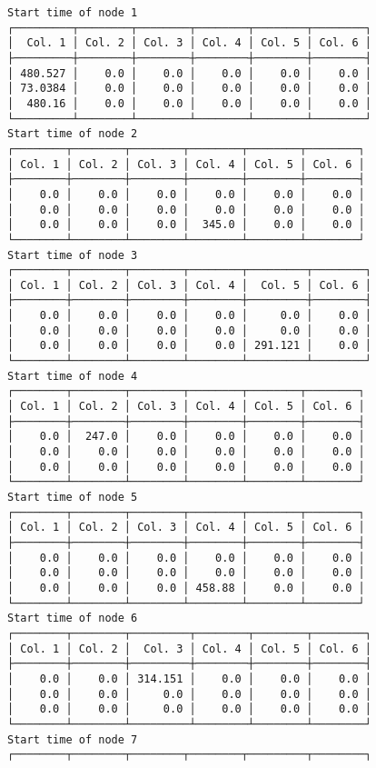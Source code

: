 \documentclass[12pt,a4paper]{article}
\begin{document}
\begin{lstlisting}
Start time of node 1
┌─────────┬────────┬────────┬────────┬────────┬────────┐
│  Col. 1 │ Col. 2 │ Col. 3 │ Col. 4 │ Col. 5 │ Col. 6 │
├─────────┼────────┼────────┼────────┼────────┼────────┤
│ 480.527 │    0.0 │    0.0 │    0.0 │    0.0 │    0.0 │
│ 73.0384 │    0.0 │    0.0 │    0.0 │    0.0 │    0.0 │
│  480.16 │    0.0 │    0.0 │    0.0 │    0.0 │    0.0 │
└─────────┴────────┴────────┴────────┴────────┴────────┘
Start time of node 2
┌────────┬────────┬────────┬────────┬────────┬────────┐
│ Col. 1 │ Col. 2 │ Col. 3 │ Col. 4 │ Col. 5 │ Col. 6 │
├────────┼────────┼────────┼────────┼────────┼────────┤
│    0.0 │    0.0 │    0.0 │    0.0 │    0.0 │    0.0 │
│    0.0 │    0.0 │    0.0 │    0.0 │    0.0 │    0.0 │
│    0.0 │    0.0 │    0.0 │  345.0 │    0.0 │    0.0 │
└────────┴────────┴────────┴────────┴────────┴────────┘
Start time of node 3
┌────────┬────────┬────────┬────────┬─────────┬────────┐
│ Col. 1 │ Col. 2 │ Col. 3 │ Col. 4 │  Col. 5 │ Col. 6 │
├────────┼────────┼────────┼────────┼─────────┼────────┤
│    0.0 │    0.0 │    0.0 │    0.0 │     0.0 │    0.0 │
│    0.0 │    0.0 │    0.0 │    0.0 │     0.0 │    0.0 │
│    0.0 │    0.0 │    0.0 │    0.0 │ 291.121 │    0.0 │
└────────┴────────┴────────┴────────┴─────────┴────────┘
Start time of node 4
┌────────┬────────┬────────┬────────┬────────┬────────┐
│ Col. 1 │ Col. 2 │ Col. 3 │ Col. 4 │ Col. 5 │ Col. 6 │
├────────┼────────┼────────┼────────┼────────┼────────┤
│    0.0 │  247.0 │    0.0 │    0.0 │    0.0 │    0.0 │
│    0.0 │    0.0 │    0.0 │    0.0 │    0.0 │    0.0 │
│    0.0 │    0.0 │    0.0 │    0.0 │    0.0 │    0.0 │
└────────┴────────┴────────┴────────┴────────┴────────┘
Start time of node 5
┌────────┬────────┬────────┬────────┬────────┬────────┐
│ Col. 1 │ Col. 2 │ Col. 3 │ Col. 4 │ Col. 5 │ Col. 6 │
├────────┼────────┼────────┼────────┼────────┼────────┤
│    0.0 │    0.0 │    0.0 │    0.0 │    0.0 │    0.0 │
│    0.0 │    0.0 │    0.0 │    0.0 │    0.0 │    0.0 │
│    0.0 │    0.0 │    0.0 │ 458.88 │    0.0 │    0.0 │
└────────┴────────┴────────┴────────┴────────┴────────┘
Start time of node 6
┌────────┬────────┬─────────┬────────┬────────┬────────┐
│ Col. 1 │ Col. 2 │  Col. 3 │ Col. 4 │ Col. 5 │ Col. 6 │
├────────┼────────┼─────────┼────────┼────────┼────────┤
│    0.0 │    0.0 │ 314.151 │    0.0 │    0.0 │    0.0 │
│    0.0 │    0.0 │     0.0 │    0.0 │    0.0 │    0.0 │
│    0.0 │    0.0 │     0.0 │    0.0 │    0.0 │    0.0 │
└────────┴────────┴─────────┴────────┴────────┴────────┘
Start time of node 7
┌────────┬────────┬────────┬────────┬─────────┬────────┐

\end{lstlisting}
\end{document}
